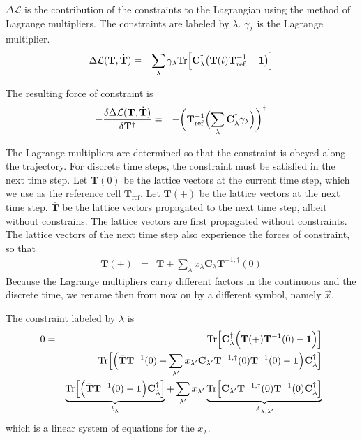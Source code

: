 \documentclass[final,12pt]{article}
\newcommand{\mat}[1]{\mathbf{#1}}
\newcommand{\Tr}{\mathrm{Tr}}      %
\begin{document}
{{{{{{$\Delta\mathcal{L}$ is the contribution of the constraints to the
Lagrangian using the method of Lagrange multipliers.  The constraints
are labeled by $\lambda$. $\gamma_\lambda$ is the Lagrange
multiplier.
\begin{eqnarray}
    \Delta\mathcal{L}(\mat{T},\dot{\mat{T}})
&=& \sum_\lambda \gamma_\lambda
         \Tr\Bigl[\mat{C}^\dagger_\lambda
                  \bigl(\mat{T}(t)\mat{T}^{-1}_{\text{ref}}-\mat{1}\bigr)
                  \Bigr]
\end{eqnarray}

The resulting force of constraint is
\begin{eqnarray}
-\frac{\delta\Delta\mathcal{L}(\mat{T},\dot{\mat{T}})}{\delta \mat{T}^\dagger}
&=& -\biggl(\mat{T}^{-1}_{\text{ref}}
\Bigl(\sum_\lambda \mat{C}^\dagger_\lambda \gamma_\lambda
                  \Bigr)\biggr)^\dagger
\end{eqnarray}

The Lagrange multipliers are determined so that the constraint is
obeyed along the trajectory. For discrete time steps, the constraint
must be satisfied in the next time step.  Let $\mat{T}(0)$ be the
lattice vectors at the current time step, which we use as the
reference cell $\mat{T}_{\text{ref}}$. Let $\mat{T}(+)$ be the lattice
vectors at the next time step.  $\mat{\bar{T}}$ be the lattice vectors
propagated to the next time step, albeit without constrains.  The
lattice vectors are first propagated without constraints. The lattice
vectors of the next time step also experience the forces of
constraint, so that
\begin{eqnarray}
\mat{T}(+)&=&\mat{\bar{T}}+\sum_{\lambda}x_\lambda\mat{C}_\lambda
\mat{T}^{-1,\dagger}(0)
\end{eqnarray}
Because the Lagrange multipliers carry different factors in the
continuous and the discrete time, we rename then from now on by a
different symbol, namely $\vec{x}$. 

The constraint labeled by $\lambda$ is
\begin{eqnarray}
0&=&\Tr\Bigl[\mat{C}^\dagger_\lambda
                  \Bigl(\mat{T}(+)\mat{T}^{-1}(0)-\mat{1}\Bigr)
                  \Bigr]
\nonumber\\
&=& \Tr\Bigl[\Bigl(\mat{\bar{T}}\mat{T}^{-1}(0)
+\sum_{\lambda'}x_{\lambda'} \mat{C}_{\lambda'}\mat{T}^{-1,\dagger}(0)\mat{T}^{-1}(0)
-\mat{1}\Bigr)\mat{C}^\dagger_\lambda\Bigr]
\nonumber\\
&=& 
\underbrace{
\Tr\Bigl[\Bigl(\mat{\bar{T}}\mat{T}^{-1}(0)
-\mat{1}\Bigr)\mat{C}^\dagger_\lambda\Bigr]}_{b_\lambda}
+\sum_{\lambda'}x_{\lambda'} 
\underbrace{
\Tr\Bigl[
\mat{C}_{\lambda'}\mat{T}^{-1,\dagger}(0)\mat{T}^{-1}(0)
\mat{C}^\dagger_\lambda\Bigr]
}_{A_{\lambda,\lambda'}}
\end{eqnarray}
which is a linear system of equations for the $x_\lambda$.

}}}}}}
\end{document}
